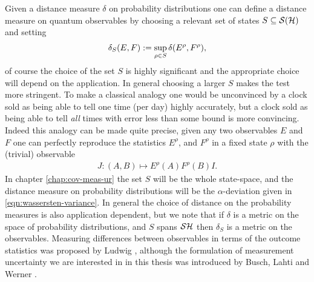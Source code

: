 Given a distance measure $\delta$ on probability distributions one can define a distance measure on quantum observables by choosing a relevant set of states $S\subseteq \dops[\hcal]$ and setting
\begin{align}
  \delta_S(E, F) := \sup_{\rho\in S} \delta(E^\rho, F^\rho),
\end{align}
of course the choice of the set $S$ is highly significant and the appropriate choice will depend on the application. In general choosing a larger $S$ makes the test more stringent. To make a classical analogy one would be unconvinced by a clock sold as being able to tell one time (per day) highly accurately, but a clock sold as being able to tell \emph{all} times with error less than some bound is more convincing. Indeed this analogy can be made quite precise, given any two observables $E$ and $F$ one can perfectly reproduce the statistics $E^\rho$, and $F^\rho$ in a fixed state $\rho$ with the (trivial) observable
\begin{align}
  J: (A,B) \mapsto E^\rho(A) F^\rho(B) I.
\end{align}
In chapter \ref{chap:cov-meas-ur} the set $S$ will be the whole state-space, and the distance measure on probability distributions will be the  $\alpha$-deviation given in \eqref{eqn:wassersten-variance}. In general the choice of distance on the probability measures is also application dependent, but we note that if $\delta$ is a metric on the space of probability distributions, and $S$ spans $\dops{\hcal}$ then $\delta_S$ is a metric on the observables. Measuring differences between observables in terms of the outcome statistics was proposed by Ludwig \cite{ludwig-foundations-of-qm}, although the formulation of measurement uncertainty we are interested in in this thesis was introduced by Busch, Lahti and Werner \cite{blw-meas-uncertainty}.

